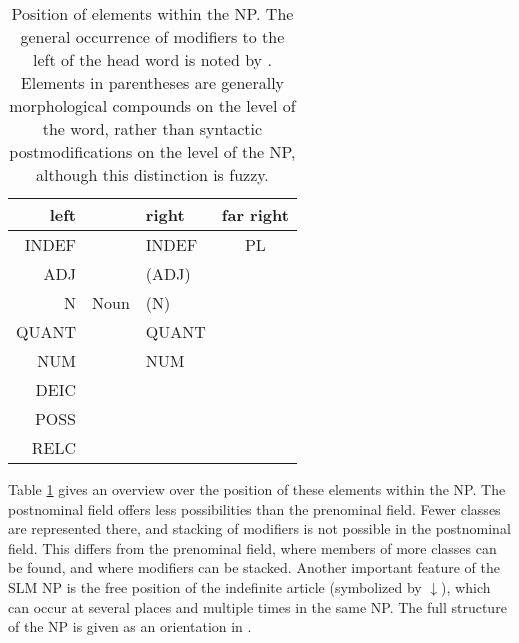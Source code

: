 \begin{table}[t]
	\centering
		\begin{tabular}{rclc}
			left 	&   	& right & far right\\
			\hline
			INDEF 	&     	& \textsc{INDEF} & PL	\\
			ADJ   	&       & (ADJ)	&	\\
			N   	& Noun 	& (N) 	&	\\
			QUANT  	& 	& QUANT &	\\
			NUM  	& 	& NUM 	&	\\
			DEIC  	& 	& 	&	\\
			POSS  	& 	& 	&	\\
			RELC  	& 	& 	&	\\
		\end{tabular}
	\caption[Position of elements within the NP]{Position of elements within the NP. The general occurrence of modifiers to the left of the head word is noted by \citet{Adelaar1991, Adelaar2005struct, SmithEtAl2004}. Elements in parentheses are generally morphological compounds on the level of the word, rather than  syntactic postmodifications on the level of the NP, although this distinction is fuzzy.}
	\label{tab:PositionOfSeveralElementsWithinTheNP}
\end{table}


Table \ref{tab:PositionOfSeveralElementsWithinTheNP} gives an overview over the position of these elements within the NP.
The postnominal field offers less possibilities than the prenominal field. Fewer classes are represented there, and stacking of modifiers is not possible in the postnominal field. This differs from the prenominal field, where members of more classes can be found, and where modifiers can be stacked. Another important feature of the SLM NP is the free position of the indefinite article (symbolized by $\downarrow$), which can occur at several places and multiple times in the same NP. The full structure of the NP is given as an orientation in .



